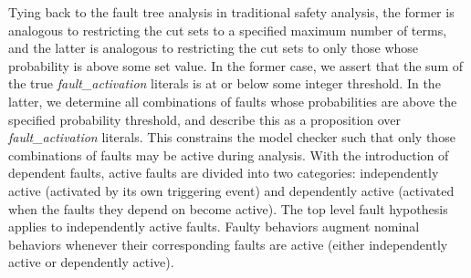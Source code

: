 Tying back to the fault tree analysis in traditional safety analysis, the former is analogous to restricting the cut sets to a specified maximum number of terms, and the latter is analogous to restricting the cut sets to only those whose probability is above some set value. In the former case, we assert that the sum of the true {\em fault\_activation} literals is at or below some integer threshold.  In the latter, we determine all combinations of faults whose probabilities are above the specified probability threshold, and describe this as a proposition over {\em fault\_activation} literals. This constrains the model checker such that only those combinations of faults may be active during analysis. 
%
With the introduction of dependent faults, active faults are divided into two categories: independently active (activated by its own triggering event) and dependently active (activated when the faults they depend on become active). The top level fault hypothesis applies to independently active faults. Faulty behaviors augment nominal behaviors whenever their corresponding faults are active (either independently active or dependently active).










